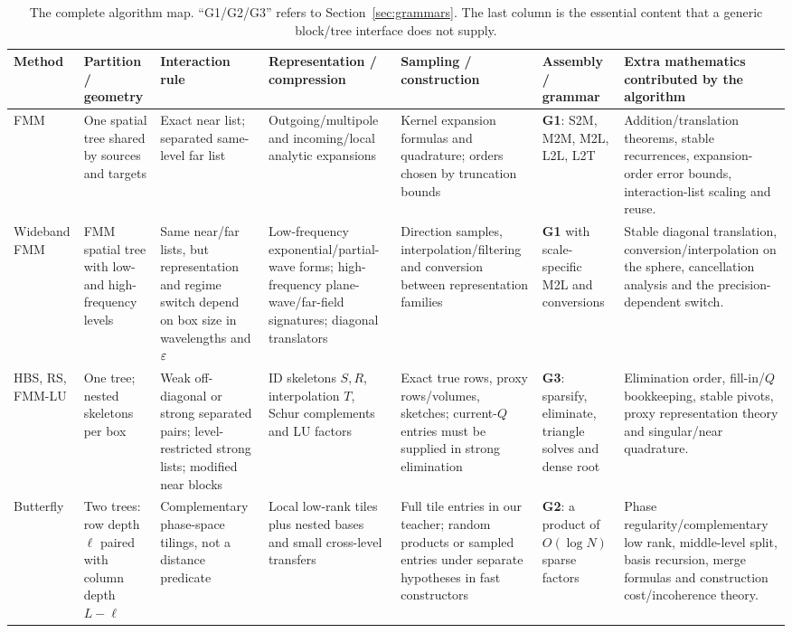 \clearpage
\begin{landscape}
\begin{table}[p]
\centering\footnotesize
\setlength{\tabcolsep}{3pt}
\caption{The complete algorithm map. ``G1/G2/G3'' refers to Section~\ref{sec:grammars}. The last column is the essential content that a generic block/tree interface does not supply.}
\label{tab:algorithm-map}
\begin{tabular}{@{}>{\raggedright\arraybackslash}p{1.55cm}>{\raggedright\arraybackslash}p{2.75cm}>{\raggedright\arraybackslash}p{2.65cm}>{\raggedright\arraybackslash}p{3.55cm}>{\raggedright\arraybackslash}p{3.45cm}>{\raggedright\arraybackslash}p{2.55cm}>{\raggedright\arraybackslash}p{5.85cm}@{}}
\toprule
Method & Partition / geometry & Interaction rule & Representation / compression & Sampling / construction & Assembly / grammar & Extra mathematics contributed by the algorithm \\
\midrule
FMM & One spatial tree shared by sources and targets & Exact near list; separated same-level far list & Outgoing/multipole and incoming/local analytic expansions & Kernel expansion formulas and quadrature; orders chosen by truncation bounds & \textbf{G1}: S2M, M2M, M2L, L2L, L2T & Addition/translation theorems, stable recurrences, expansion-order error bounds, interaction-list scaling and reuse. \\
Wideband FMM & FMM spatial tree with low- and high-frequency levels & Same near/far lists, but representation and regime switch depend on box size in wavelengths and $\varepsilon$ & Low-frequency exponential/partial-wave forms; high-frequency plane-wave/far-field signatures; diagonal translators & Direction samples, interpolation/filtering and conversion between representation families & \textbf{G1} with scale-specific M2L and conversions & Stable diagonal translation, conversion/interpolation on the sphere, cancellation analysis and the precision-dependent switch. \\
HBS, RS, FMM-LU & One tree; nested skeletons per box & Weak off-diagonal or strong separated pairs; level-restricted strong lists; modified near blocks & ID skeletons $S,R$, interpolation $T$, Schur complements and LU factors & Exact true rows, proxy rows/volumes, sketches; current-$Q$ entries must be supplied in strong elimination & \textbf{G3}: sparsify, eliminate, triangle solves and dense root & Elimination order, fill-in/$Q$ bookkeeping, stable pivots, proxy representation theory and singular/near quadrature. \\
Butterfly & Two trees: row depth $\ell$ paired with column depth $L-\ell$ & Complementary phase-space tilings, not a distance predicate & Local low-rank tiles plus nested bases and small cross-level transfers & Full tile entries in our teacher; random products or sampled entries under separate hypotheses in fast constructors & \textbf{G2}: a product of $O(\log N)$ sparse factors & Phase regularity/complementary low rank, middle-level split, basis recursion, merge formulas and construction cost/incoherence theory. \\

\end{tabular}
\end{table}
\end{landscape}
